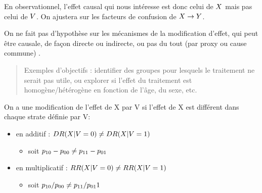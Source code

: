 \documentclass[
]{book}
\providecommand{\tightlist}{%
  \setlength{\itemsep}{0pt}\setlength{\parskip}{0pt}}
\begin{document}
En observationnel, l'effet causal qui nous intéresse est donc celui de \(\small X\) mais pas celui de \(\small V\).
On ajustera sur les facteurs de confusion de \(\small X \rightarrow Y\).

On ne fait pas d'hypothèse sur les mécanismes de la modification d'effet, qui peut être causale, de façon directe ou indirecte, ou pas du tout (par proxy ou cause commune) \citet{vanderweele_four_2007}.

\begin{quote}
Exemples d'objectifs : identifier des groupes pour lesquels le traitement ne serait pas utile, ou explorer si l'effet du traitement est homogène/hétérogène en fonction de l'âge, du sexe, etc.
\end{quote}

On a une modification de l'effet de X par V si l'effet de X est différent dans chaque strate définie par V:

\begin{itemize}
\tightlist
\item
  en additif : \(\small DR(X | V=0) \neq DR(X | V=1)\)

  \begin{itemize}
  \tightlist
  \item
    soit \(\small p_{10}-p_{00} \neq p_{11}-p_{01}\)\\
  \end{itemize}
\item
  en multiplicatif : \(\small RR(X | V=0) \neq RR(X | V=1)\)

  \begin{itemize}
  \tightlist
  \item
    soit \(\small p_{10}/p_{00} \neq p_{11}/p_{01}1\)
  \end{itemize}
\end{itemize}
\end{document}

